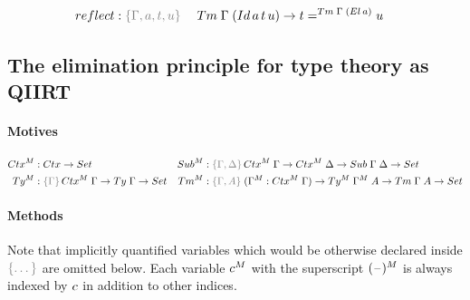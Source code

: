 \documentclass[a4paper,UKenglish,numberwithinsect,cleveref,thm-restate]{lipics-v2021}
\begin{document}
\begin{alignat*}{5}
  \mathsf{reflect} & : \implicit{\Gamma, a, t, u}\;&& \Tm\;\Gamma\;(\mathsf{Id}\,a\,t\,u) \to t =^{\Tm\;\Gamma\;(\El\,a)} u
\end{alignat*}


\subsection{The elimination principle for type theory as QIIRT} \label{subsec:def:elimination}

\paragraph*{Motives}
\begin{align*}
  \Ctx^M & : \Ctx \to \Set &
  \Sub^M & : \implicit{\Gamma, \Delta}\,\Ctx^M\;\Gamma \to \Ctx^M\;\Delta \to \Sub\;\Gamma\;\Delta \to \Set \\
  \Ty^M  & : \implicit{\Gamma}\,\Ctx^M\;\Gamma \to \Ty\;\Gamma \to \Set &
  \Tm^M  & : \implicit{\Gamma, A}\; (\Gamma^M : \Ctx^M\;\Gamma) \to \Ty^M\;\Gamma^M\;A \to \Tm\;\Gamma\;A \to \Set
\end{align*}

\paragraph*{Methods}
Note that implicitly quantified variables which would be otherwise declared inside $\implicit{\dots}$ are omitted below.
Each variable $\cc^M$ with the superscript $(\mathord{\hspace{1pt}\text{--}\hspace{1pt}})^M$ is always indexed by $\cc$ in addition to other indices.
\end{document}
